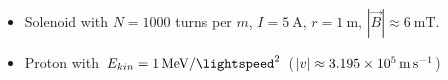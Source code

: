 \documentclass{beamer}
\begin{document}
\begin{frame}
%


\begin{itemize}
\item<1> Solenoid with $N=1000$ turns per $m$, $I=\SI{5}{\ampere}$, $r=\SI{1}{\meter}$, $|\vec{B}|\approx\SI{6}{\milli\tesla}$.
\item<1> Proton with $E_{kin}=\SI{1}{\mega\electronvolt\per\square\lightspeed}$ ($|v|\approx \SI{3.195E5}{\meter\per\second}$)
\end{itemize}

\end{frame}
\end{document}
